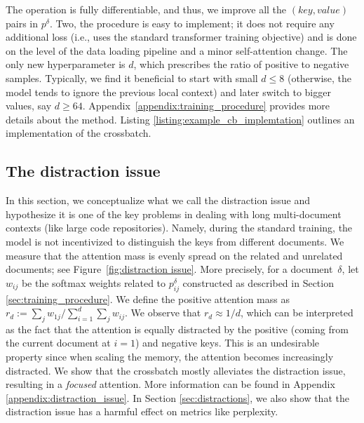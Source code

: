 The operation is fully differentiable, and thus, we improve all the $(key, value)$ pairs in $p^\delta$.
Two, the procedure is easy to implement; it does not require any additional loss (i.e., uses the standard transformer training objective) and is done on the level of the data loading pipeline and a minor self-attention change. The only new hyperparameter is $d$, which prescribes the ratio of positive to negative samples. Typically, we find it beneficial to start with small $d \leq 8$ (otherwise, the model tends to ignore the previous local context) and later switch to bigger values, say $d\geq64$. Appendix~\ref{appendix:training_procedure} provides more details about the method. {Listing \ref{listing:example_cb_implemtation} outlines an  implementation of the crossbatch.}

\subsection{The distraction issue} \label{sec:distraction_issue}

In this section, we conceptualize what we call the distraction issue and hypothesize it is one of the key problems in {dealing with long multi-document contexts (like large code repositories)}. Namely, during the standard training, the model is not incentivized to distinguish the keys from different documents. We measure that the attention mass is evenly spread on the related and unrelated documents; see Figure~\ref{fig:distraction issue}. More precisely, for a document~$\delta$, let $w_{ij}$ be the softmax weights related to $p^\delta_{ij}$ constructed as described in Section \ref{sec:training_procedure}. We define the positive attention mass as $r_d:=\sum_{j} w_{1 j}/ \sum_{i=1}^d\sum_{j} w_{ij}$. We observe that $r_d \approx 1/d$, which can be interpreted as the fact that the attention is equally distracted by the positive (coming from the current document at $i=1$) and negative keys. This is an undesirable property since when scaling the memory, the attention becomes increasingly distracted. We show that the crossbatch mostly alleviates the distraction issue, resulting in a \emph{focused} attention. More information can be found in Appendix \ref{appendix:distraction_issue}. In Section \ref{sec:distractions}, we also show that the distraction issue has a harmful effect on metrics like perplexity.


